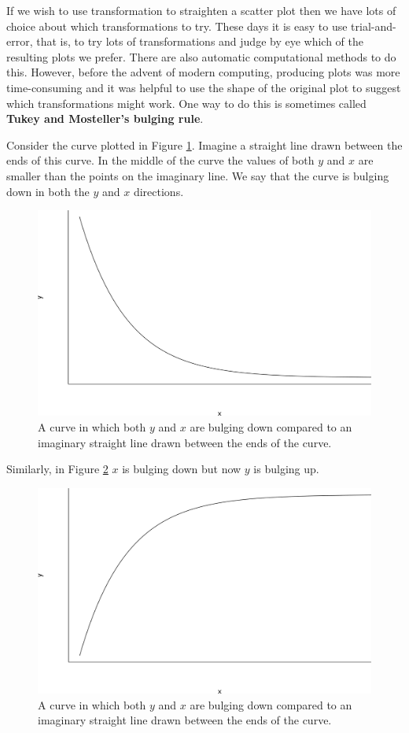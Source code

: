 \documentclass[
  11pt,
  british,
  openany, a4paper]{book}
\begin{document}
If we wish to use transformation to straighten a scatter plot then we have lots of choice about which transformations to try. These days it is easy to use trial-and-error, that is, to try lots of transformations and judge by eye which of the resulting plots we prefer. There are also automatic computational methods to do this. However, before the advent of modern computing, producing plots was more time-consuming and it was helpful to use the shape of the original plot to suggest which transformations might work. One way to do this is sometimes called \textbf{Tukey and Mosteller's bulging rule}.

Consider the curve plotted in Figure \ref{fig:hollowup}. Imagine a straight line drawn between the ends of this curve. In the middle of the curve the values of both \(y\) and \(x\) are smaller than the points on the imaginary line. We say that the curve is bulging down in both the \(y\) and \(x\) directions.

\begin{figure}

{\centering \includegraphics[width=0.75\linewidth]{images/hollow_up} 

}

\caption{A curve in which both $y$ and $x$ are bulging down compared to an imaginary straight line drawn between the ends of the curve.}\label{fig:hollowup}
\end{figure}

Similarly, in Figure \ref{fig:hollowdown} \(x\) is bulging down but now \(y\) is bulging up.

\begin{figure}

{\centering \includegraphics[width=0.75\linewidth]{images/hollow_down} 

}

\caption{A curve in which both $y$ and $x$ are bulging down compared to an imaginary straight line drawn between the ends of the curve.}\label{fig:hollowdown}
\end{figure}
\end{document}
